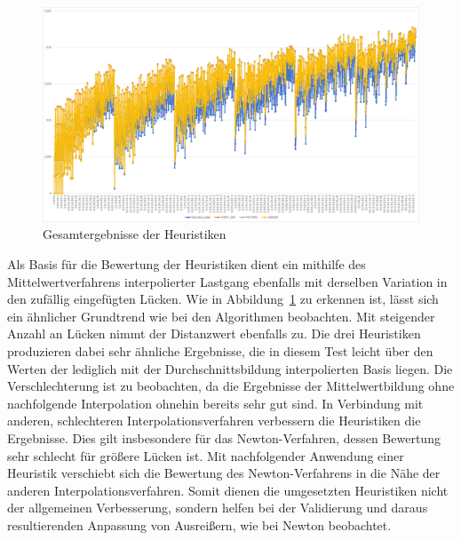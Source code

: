 \begin{figure}[!t]
	\begin{center}
		\includegraphics[width=0.9\columnwidth]{pics/evaluation-heuristics}
	\end{center}
	\caption{\label{fig:evaluation_heuristics}Gesamtergebnisse der Heuristiken}
\end{figure}

Als Basis für die Bewertung der Heuristiken dient ein mithilfe des Mittelwertverfahrens interpolierter Lastgang ebenfalls mit derselben Variation in den zufällig eingefügten Lücken. Wie in Abbildung~\ref{fig:evaluation_heuristics} zu erkennen ist, lässt sich ein ähnlicher Grundtrend wie bei den Algorithmen beobachten. Mit steigender Anzahl an Lücken nimmt der Distanzwert ebenfalls zu. Die drei Heuristiken produzieren dabei sehr ähnliche Ergebnisse, die in diesem Test leicht über den Werten der lediglich mit der Durchschnittsbildung interpolierten Basis liegen.
Die Verschlechterung ist zu beobachten, da die Ergebnisse der Mittelwertbildung ohne nachfolgende Interpolation ohnehin bereits sehr gut sind. In Verbindung mit anderen, schlechteren Interpolationsverfahren verbessern die Heuristiken die Ergebnisse. Dies gilt insbesondere für das Newton-Verfahren, dessen Bewertung sehr schlecht für größere Lücken ist. Mit nachfolgender Anwendung einer Heuristik verschiebt sich die Bewertung des Newton-Verfahrens in die Nähe der anderen Interpolationsverfahren.
Somit dienen die umgesetzten Heuristiken nicht der allgemeinen Verbesserung, sondern helfen bei der Validierung und daraus resultierenden Anpassung von Ausreißern, wie bei Newton beobachtet.